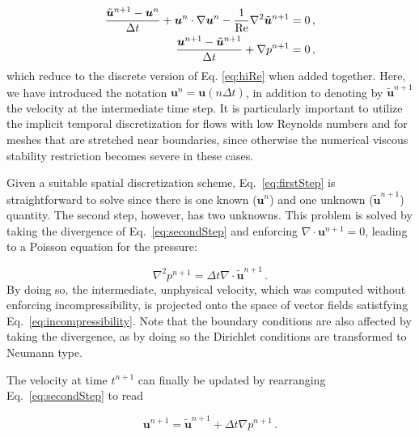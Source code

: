 \documentclass[final,3p,twocolumn]{elsarticle}
\begin{document}
\begin{align}
    \label{eq:firstStep}
    \frac{\tilde{\bm{u}}^{n+1} - \bm{u}^n}{\Delta t} + \bm{u}^n \cdot \nabla
    \bm{u}^n - \frac{1}{\rm Re} \nabla^2 \tilde{\bm{u}}^{n+1} &= 0 \,, \\
    \label{eq:secondStep}
    \frac{\bm{u}^{n+1} - \tilde{\bm{u}}^{n+1}}{\Delta t} + \nabla p^{n+1} &= 0
    \,,
\end{align}
%
which reduce to the discrete version of Eq. \eqref{eq:hiRe} when added
together. Here, we have introduced the notation $\bm{u}^n = \bm{u}(n \Delta
t)$, in addition to denoting by $\tilde{\bm{u}}^{n+1}$ the velocity at the
intermediate time step.  It is particularly important to utilize the implicit
temporal discretization for flows with low Reynolds numbers and for meshes that
are stretched near boundaries, since otherwise the numerical viscous stability
restriction becomes severe in these cases. 

Given a suitable spatial discretization scheme, Eq.\ \eqref{eq:firstStep} is
straightforward to solve since there is one known ($\bm{u}^n$) and one unknown
($\tilde{\bm{u}}^{n+1}$) quantity. The second step, however, has two unknowns.
This problem is solved by taking the divergence of Eq. \eqref{eq:secondStep}
and enforcing $\nabla \cdot \bm{u}^{n+1} = 0$, leading to a Poisson equation
for the pressure:

\begin{equation} 
    \nabla^2 p^{n+1} = \Delta t \nabla \cdot \tilde{\bm{u}}^{n+1} \,.
    \label{eq:poissonPressure}
\end{equation}
%
By doing so, the intermediate, unphysical velocity, which was computed without
enforcing incompressibility, is projected onto the space of vector fields
satistfying Eq.\ \eqref{eq:incompressibility}. Note that the boundary
conditions are also affected by taking the divergence, as by doing so the
Dirichlet conditions are transformed to Neumann type. 

The velocity at time $t^{n+1}$ can finally be updated by rearranging Eq.\
\eqref{eq:secondStep} to read 

\begin{equation}
    \bm{u}^{n+1} = \tilde{\bm{u}}^{n+1} + \Delta t \nabla p^{n+1} \,. 
    \label{eq:velocityUpdate}
\end{equation}
\end{document}
